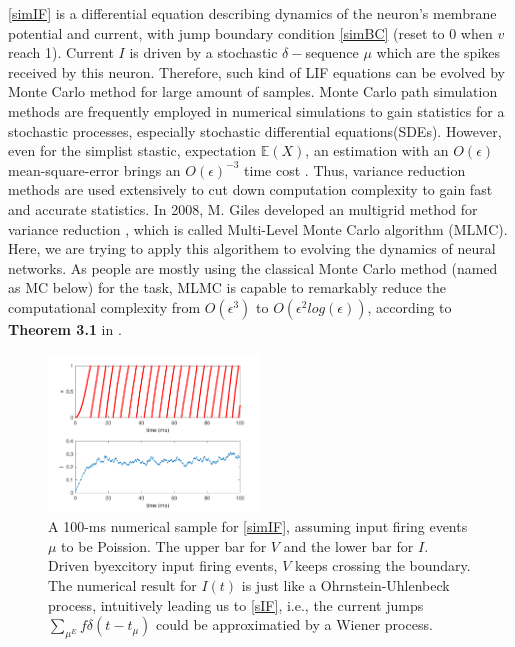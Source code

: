 \documentclass[10pt]{article}
\begin{document}
\begin{multicols}{2}
\ref{simIF} is a differential equation describing dynamics of the neuron's membrane potential and current, with jump boundary condition \ref{simBC} (reset to 0 when $v$ reach 1). Current $I$ is driven by a stochastic $\delta-$sequence $\mu$ which are the spikes received by this neuron. Therefore, such kind of LIF equations can be evolved by Monte Carlo method for large amount of samples. Monte Carlo path simulation methods are frequently employed in numerical simulations to gain statistics for a stochastic processes, especially stochastic differential equations(SDEs). However, even for the simplist stastic, expectation $\mathbb{E}(X)$, an estimation with an $O(\epsilon)$ mean-square-error brings an $O(\epsilon)^{-3}$ time cost \cite{Giles2008}. Thus, variance reduction methods are used extensively to cut down computation complexity to gain fast and accurate statistics. In 2008, M. Giles developed an multigrid method for variance reduction \cite{Giles2008}, which is called Multi-Level Monte Carlo algorithm (MLMC). Here, we are trying to apply this algorithem to evolving the dynamics of neural networks. As people are mostly using the classical Monte Carlo method (named as MC below) for the task, MLMC is capable to remarkably reduce the computational complexity from $O(\epsilon^3)$ to $O(\epsilon^2 log(\epsilon))$, according to {\bf{Theorem 3.1}} in \cite{Giles2008}.
\begin{figure}[H] %
\includegraphics[width=0.5\textwidth]{VI_plots.pdf}
\caption{\color{Gray}A 100-ms numerical sample for \ref{simIF}, assuming input firing events $\mu$ to be Poission. The upper bar for $V$ and the lower bar for $I$. Driven byexcitory input firing events, $V$ keeps crossing the boundary. The numerical result for $I(t)$ is just like a Ohrnstein-Uhlenbeck process, intuitively leading us to \ref{sIF}, i.e., the current jumps $\sum_{\mu^{E}}f\delta(t-t_{\mu})$ could be approximatied by a Wiener process.}
\label{VI_plots} %
\end{figure}

\end{multicols}
\end{document}
